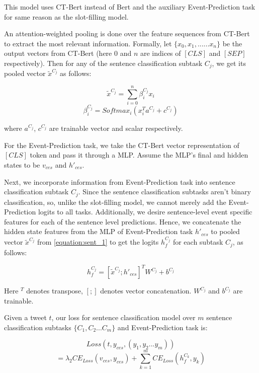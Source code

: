 \documentclass[11pt,a4paper]{article}
\begin{document}
This model uses CT-Bert instead of Bert and the auxiliary Event-Prediction task for same reason as the slot-filling model.
 
An attention-weighted pooling is done over the feature sequences from CT-Bert to extract the most relevant information. Formally, let $\{x_0, x_1,... ...x_n \}$ be the output vectors from CT-Bert (here $0$ and $n$ are indices of $[CLS]$ and $[SEP]$ respectively). Then for any of the sentence classification subtask $C_j$, we get its pooled vector $\widetilde{x}^{C_j}$ as follows:

\begin{equation}
\widetilde{x}^{C_j} = \sum_{i=0}^{n}\beta_i^{C_j}x_i
\label{equation:sent_1}
\end{equation}
$$\beta_i^{C_j} = Softmax_{i}(x_i^T a^{C_j} + c^{C_j})$$

where $a^{C_j}$, $c^{C_j}$ are trainable vector and scalar respectively.

For the Event-Prediction task, we take the CT-Bert vector representation of $[CLS]$ token and pass it through a MLP. Assume the MLP's final and hidden states to be $v_{ces}$ and $h'_{ces}$.

Next, we incorporate information from Event-Prediction task into sentence classification subtask $C_j$. Since the sentence classification subtasks aren't binary classification, so, unlike the slot-filling model, we cannot merely add the Event-Prediction logits to all tasks. Additionally, we desire sentence-level event specific features for each of the sentence level predictions. Hence, we concatenate the hidden state features from the MLP of Event-Prediction task $h'_{ces}$ to pooled vector $\widetilde{x}^{C_j}$ from \ref{equation:sent_1} to get the logits $h_f^{C_j}$ for each subtask ${C_j}$, as follows:

\begin{equation}
\displaystyle{h_f^{C_j}} = [\widetilde{x}^{C_j} ; h'_{ces}]^T W^{C_j} + b^{C_j}
\end{equation}

Here ${ }^T$ denotes transpose, $[ ; ]$ denotes vector concatenation. $W^{C_j}$ and $b^{C_j}$ are trainable.

Given a tweet $t$, our loss for sentence classification model over $m$ sentence classification subtasks $\{C_1, C_2 ... C_m\}$ and Event-Prediction task is:

$$Loss(t, y_{ces}, (y_1, y_2 ... y_m))$$
\begin{equation}
= \lambda_2 CE_{Loss}(v_{ces}, y_{ces}) + \sum_{k=1}^{m}CE_{Loss}(h_f^{C_k}, y_k)
\end{equation}
\end{document}
